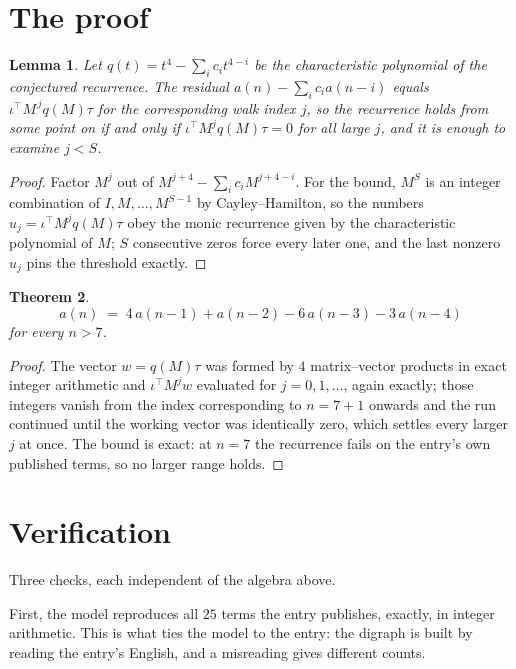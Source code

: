 \documentclass[11pt,a4paper]{article}
\theoremstyle{plain}
\newtheorem{theorem}{Theorem}
\newtheorem{lemma}[theorem]{Lemma}
\theoremstyle{definition}
\begin{document}
\section{The proof}

\begin{lemma}\label{lem:crit}
Let $q(t)=t^{4}-\sum_i c_it^{4-i}$ be the characteristic polynomial of the
conjectured recurrence. The residual $a(n)-\sum_ic_ia(n-i)$ equals
$\iota^{\!\top}M^{\,j}q(M)\tau$ for the corresponding walk index $j$, so the recurrence
holds from some point on if and only if $\iota^{\!\top}M^{j}q(M)\tau=0$ for all large $j$,
and it is enough to examine $j<S$.
\end{lemma}

\begin{proof}
Factor $M^{j}$ out of $M^{j+4}-\sum_ic_iM^{j+4-i}$. For the bound, $M^{S}$
is an integer combination of $I,M,\dots,M^{S-1}$ by Cayley--Hamilton, so the numbers
$u_j=\iota^{\!\top}M^{j}q(M)\tau$ obey the monic recurrence given by the characteristic
polynomial of $M$; $S$ consecutive zeros force every later one, and the last nonzero $u_j$
pins the threshold exactly.
\end{proof}

\begin{theorem}
\[
a(n)\;=\;4\,a(n-1) + a(n-2) - 6\,a(n-3) - 3\,a(n-4)
\]
for every $n>7$.
\end{theorem}

\begin{proof}
The vector $w=q(M)\tau$ was formed by $4$ matrix--vector products in exact integer
arithmetic and $\iota^{\!\top}M^{j}w$ evaluated for $j=0,1,\dots$, again exactly; those
integers vanish from the index corresponding to $n=7+1$ onwards and the run continued
until the working vector was identically zero, which settles every larger $j$ at once. The bound is exact: at $n=7$ the recurrence fails on the entry's own published terms, so no larger range holds.
\end{proof}

\section{Verification}

Three checks, each independent of the algebra above.

First, the model reproduces all $25$ terms the entry publishes, exactly, in integer
arithmetic. This is what ties the model to the entry: the digraph is built by reading the
entry's English, and a misreading gives different counts.
\end{document}
